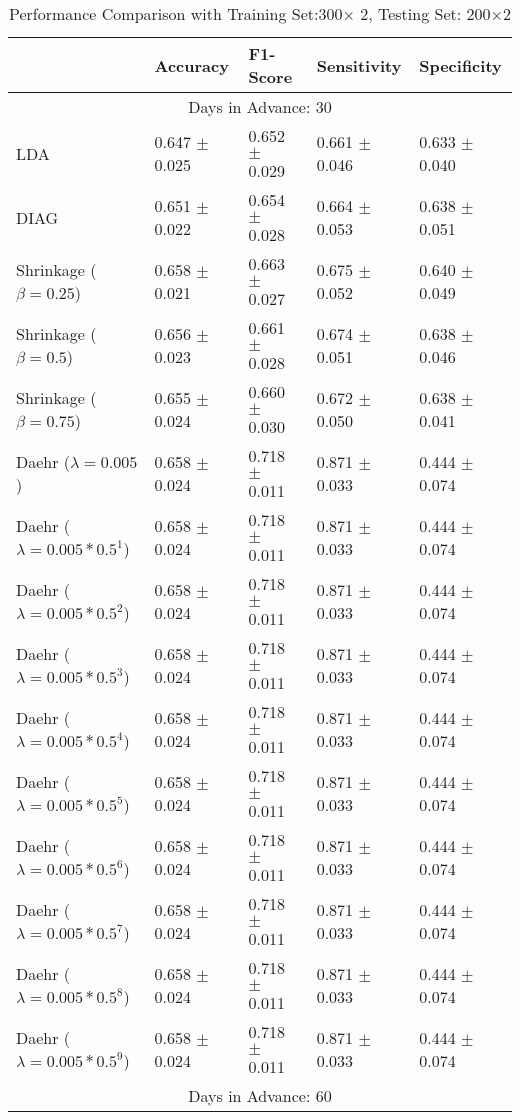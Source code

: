 \begin{table}
\caption{Performance Comparison with Training Set:300$\times$ 2, Testing Set: 200$\times$2}
\footnotesize
\centering
\begin{tabular}{*{5}{l}}
\toprule
 & Accuracy & F1-Score & Sensitivity & Specificity\\
\hline\multicolumn{5}{c}{  Days in Advance: 30}\\\hline
LDA&0.647 $\pm$ 0.025&0.652 $\pm$ 0.029&0.661 $\pm$ 0.046&0.633 $\pm$ 0.040\\
DIAG&0.651 $\pm$ 0.022&0.654 $\pm$ 0.028&0.664 $\pm$ 0.053&0.638 $\pm$ 0.051\\
Shrinkage ($\beta=0.25$)&0.658 $\pm$ 0.021&0.663 $\pm$ 0.027&0.675 $\pm$ 0.052&0.640 $\pm$ 0.049\\
Shrinkage ($\beta=0.5$)&0.656 $\pm$ 0.023&0.661 $\pm$ 0.028&0.674 $\pm$ 0.051&0.638 $\pm$ 0.046\\
Shrinkage ($\beta=0.75$)&0.655 $\pm$ 0.024&0.660 $\pm$ 0.030&0.672 $\pm$ 0.050&0.638 $\pm$ 0.041\\
Daehr ($\lambda=0.005$)&0.658 $\pm$ 0.024&0.718 $\pm$ 0.011&0.871 $\pm$ 0.033&0.444 $\pm$ 0.074\\
Daehr ($\lambda=0.005*0.5^1$)&0.658 $\pm$ 0.024&0.718 $\pm$ 0.011&0.871 $\pm$ 0.033&0.444 $\pm$ 0.074\\
Daehr ($\lambda=0.005*0.5^2$)&0.658 $\pm$ 0.024&0.718 $\pm$ 0.011&0.871 $\pm$ 0.033&0.444 $\pm$ 0.074\\
Daehr ($\lambda=0.005*0.5^3$)&0.658 $\pm$ 0.024&0.718 $\pm$ 0.011&0.871 $\pm$ 0.033&0.444 $\pm$ 0.074\\
Daehr ($\lambda=0.005*0.5^4$)&0.658 $\pm$ 0.024&0.718 $\pm$ 0.011&0.871 $\pm$ 0.033&0.444 $\pm$ 0.074\\
Daehr ($\lambda=0.005*0.5^5$)&0.658 $\pm$ 0.024&0.718 $\pm$ 0.011&0.871 $\pm$ 0.033&0.444 $\pm$ 0.074\\
Daehr ($\lambda=0.005*0.5^6$)&0.658 $\pm$ 0.024&0.718 $\pm$ 0.011&0.871 $\pm$ 0.033&0.444 $\pm$ 0.074\\
Daehr ($\lambda=0.005*0.5^7$)&0.658 $\pm$ 0.024&0.718 $\pm$ 0.011&0.871 $\pm$ 0.033&0.444 $\pm$ 0.074\\
Daehr ($\lambda=0.005*0.5^8$)&0.658 $\pm$ 0.024&0.718 $\pm$ 0.011&0.871 $\pm$ 0.033&0.444 $\pm$ 0.074\\
Daehr ($\lambda=0.005*0.5^9$)&0.658 $\pm$ 0.024&0.718 $\pm$ 0.011&0.871 $\pm$ 0.033&0.444 $\pm$ 0.074\\
\hline\multicolumn{5}{c}{  Days in Advance: 60}\\\hline

\end{tabular}
\end{table}
